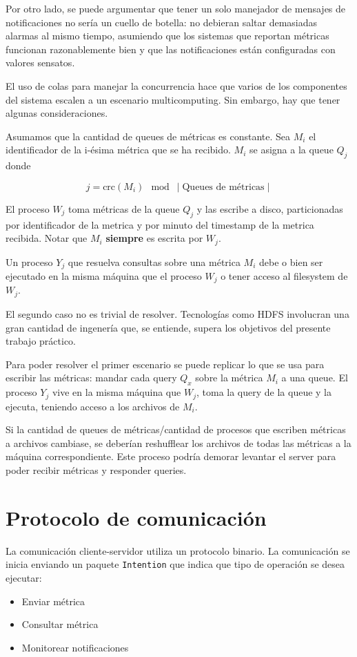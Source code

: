 \documentclass[titlepage,a4paper,oneside]{article}
\begin{document}
Por otro lado, se puede argumentar que tener un solo manejador de mensajes de notificaciones no sería un cuello de botella: no debieran saltar demasiadas alarmas al mismo tiempo, asumiendo que los sistemas que reportan métricas funcionan razonablemente bien y que las notificaciones están configuradas con valores sensatos.

El uso de colas para manejar la concurrencia hace que varios de los componentes del sistema escalen a un escenario multicomputing. Sin embargo, hay que tener algunas consideraciones.

Asumamos que la cantidad de queues de métricas es constante. Sea $M_i$ el identificador de la i-ésima métrica que se ha recibido. $M_i$ se asigna a la queue $Q_j$ donde

\begin{equation}\label{crcindex}
	j = \text{crc}(M_i) \mod \mid \text{Queues de métricas} \mid
\end{equation}

El proceso $W_j$ toma métricas de la queue $Q_j$ y las escribe a disco, particionadas por identificador de la metrica y por minuto del timestamp de la metrica recibida. Notar que $M_i$ \textbf{siempre} es escrita por $W_j$.

Un proceso $Y_j$ que resuelva consultas sobre una métrica $M_i$ debe o bien ser ejecutado en la misma máquina que el proceso $W_j$ o tener acceso al filesystem de $W_j$.

El segundo caso no es trivial de resolver. Tecnologías como HDFS\cite{HDFS} involucran una gran cantidad de ingenería que, se entiende, supera los objetivos del presente trabajo práctico.

Para poder resolver el primer escenario se puede replicar lo que se usa para escribir las métricas: mandar cada query $Q_x$ sobre la métrica $M_i$ a una queue. El proceso $Y_j$ vive en la misma máquina que $W_j$, toma la query de la queue y la ejecuta, teniendo acceso a los archivos de $M_i$.

Si la cantidad de queues de métricas/cantidad de procesos que escriben métricas a archivos cambiase, se deberían reshufflear los archivos de todas las métricas a la máquina correspondiente. Este proceso podría demorar levantar el server para poder recibir métricas y responder queries.

\section{Protocolo de comunicación}
La comunicación cliente-servidor utiliza un protocolo binario. La comunicación se inicia enviando un paquete \texttt{Intention}\cite{IntentionPackage} que indica que tipo de operación se desea ejecutar:
\begin{itemize}
	\item Enviar métrica
	\item Consultar métrica
	\item Monitorear notificaciones
\end{itemize}
\end{document}
